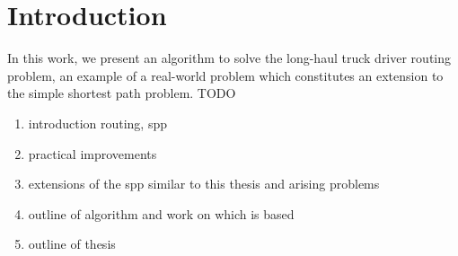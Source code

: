 
\chapter{Introduction}
\label{ch:introduction}
In this work, we present an algorithm to solve the long-haul truck driver routing problem, an example of a real-world problem which constitutes an extension to the simple shortest path problem. TODO
\begin{enumerate}
	\item introduction routing, spp
	\item practical improvements
	\item extensions of the spp similar to this thesis and arising problems
	\item outline of algorithm and work on which is based
	\item outline of thesis
\end{enumerate}